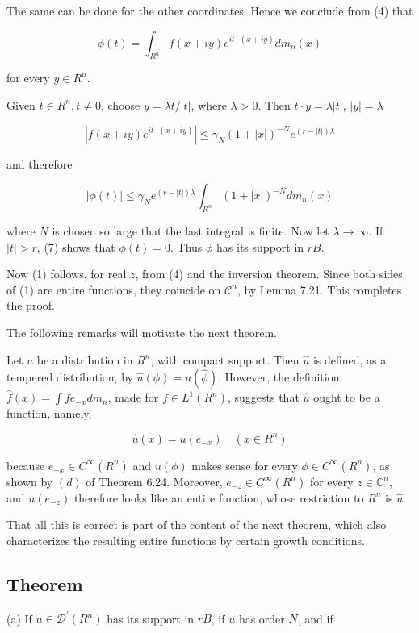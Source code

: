 \documentclass[10pt]{article}
\begin{document}
The same can be done for the other coordinates. Hence we conciude from (4) that

$$
\phi(t)=\int_{R^{n}} f(x+i y) e^{i t \cdot(x+i y)} d m_{n}(x)
$$

for every $y \in R^{n}$.

Given $t \in R^{n}, t \neq 0$, choose $y=\lambda t /|t|$, where $\lambda>0$. Then $t \cdot y=\lambda|t|$, $|y|=\lambda$

$$
\left|f(x+i y) e^{i t \cdot(x+i y)}\right| \leq \gamma_{N}(1+|x|)^{-N} e^{(r-|t|) \lambda}
$$

and therefore

$$
|\phi(t)| \leq \gamma_{N} e^{(r-|t|) \lambda} \int_{R^{n}}(1+|x|)^{-N} d m_{n}(x)
$$

where $N$ is chosen so large that the last integral is finite. Now let $\lambda \rightarrow \infty$. If $|t|>r$, (7) shows that $\phi(t)=0$. Thus $\phi$ has its support in $r B$.

Now (1) follows, for real $z$, from (4) and the inversion theorem. Since both sides of (1) are entire functions, they coincide on $\mathscr{C}^{n}$, by Lemma 7.21. This completes the proof.

The following remarks will motivate the next theorem.

Let $u$ be a distribution in $R^{n}$, with compact support. Then $\hat{u}$ is defined, as a tempered distribution, by $\hat{u}(\phi)=u(\hat{\phi})$. However, the definition $\hat{f}(x)=\int f e_{-x} d m_{n}$, made for $f \in L^{1}\left(R^{n}\right)$, suggests that $\hat{u}$ ought to be a function, namely,

$$
\hat{u}(x)=u\left(e_{-x}\right) \quad\left(x \in R^{n}\right)
$$

because $e_{-x} \in C^{\infty}\left(R^{n}\right)$ and $u(\phi)$ makes sense for every $\phi \in C^{\infty}\left(R^{n}\right)$, as shown by $(d)$ of Theorem 6.24. Moreover, $e_{-z} \in C^{\infty}\left(R^{n}\right)$ for every $z \in \mathbb{C}^{n}$, and $u\left(e_{-z}\right)$ therefore looks like an entire function, whose restriction to $R^{n}$ is $\hat{u}$.

That all this is correct is part of the content of the next theorem, which also characterizes the resulting entire functions by certain growth conditions.

\subsection{Theorem}
(a) If $u \in \mathscr{D}^{\prime}\left(R^{n}\right)$ has its support in $r B$, if $u$ has order $N$, and if
\end{document}
